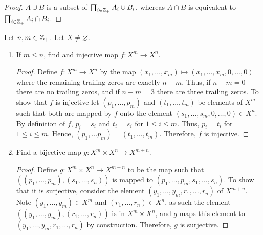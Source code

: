 \documentclass[12pt]{article}
\begin{document}
\begin{enumerate}[label=(\alph*)]
\begin{proof}
			$A \cup B$ is a subset of $\prod_{i \in \mathbb{Z}_{+}} A_i \cup B_i$, whereas 
			$A \cap B$ is equivalent to $\prod_{i \in \mathbb{Z}_{+}} A_i \cap B_i$.
		\end{proof}
	\end{enumerate}
	
	 Let $n, m \in \mathbb{Z}_{+}$. Let $X \neq \varnothing$.
	\begin{enumerate}[label=(\alph*)]
		\item If $m \leq n$, find and injective map $f: X^m \to X^n$.
		\begin{proof}
			Define $f: X^m \to X^n$ by the map $(x_1, \ldots, x_m) \mapsto
			(x_1, \ldots, x_m, 0,\ldots, 0)$ where the remaining trailing zeros
			are exactly $n - m$. Thus, if $n - m = 0$ there are no trailing zeros,
			and if $n - m = 3$ there are three trailing zeros. To show that 
			$f$ is injective let $(p_1, \ldots, p_m)$ and $(t_1, \ldots, t_m)$
			be elements of $X^m$ such that both are mapped by $f$ onto
			the element $(s_1, \ldots, s_m, 0, \ldots, 0) \in X^n$. By definition
			of $f$, $p_i = s_i$ and $t_i = s_i$ for $1 \leq i \leq m$. Thus,
			$p_i = t_i$ for $1 \leq i \leq m$. Hence, $(p_1, \ldots p_m) = 
			(t_1, \ldots, t_m)$. Therefore, $f$ is injective.
		\end{proof}
		\item Find a bijective map $g: X^m \times X^n \to X^{m + n}$.
		\begin{proof}
			Define $g: X^m \times X^n \to X^{m + n}$ to be the map such that 
			$((p_1, \ldots, p_m), (s_1, \ldots, s_n))$ is mapped to $(p_1, \ldots, p_m, s_1, \ldots, s_n)$.
			To show that it is surjective, consider the element 
			$(y_1, \ldots, y_m, r_1, \ldots, r_n)$ of $X^{m + n}$. Note 
			$(y_1, \ldots, y_m) \in X^m$ and $(r_1, \ldots, r_n) \in X^n$,
			as such the element $((y_1, \ldots, y_m), (r_1, \ldots, r_n))$ is in $X^m \times X^n$,
			and $g$ maps this element to $(y_1, \ldots, y_m, r_1, \ldots, r_n)$
			by construction. Therefore, $g$ is surjective.
			

\end{proof}
\end{enumerate}
\end{document}
